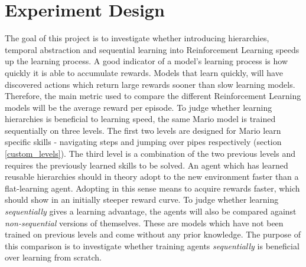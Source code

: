 \documentclass[notitlepage,a4paper,11pt]{article}
\begin{document}
\section{Experiment Design}
The goal of this project is to investigate whether introducing hierarchies, temporal abstraction and sequential learning into Reinforcement Learning speeds up the learning process. A good indicator of a model's learning process is how quickly it is able to accumulate rewards. Models that learn quickly, will have discovered actions which return large rewards sooner than slow learning models. Therefore, the main metric used to compare the different Reinforcement Learning models will be the average reward per episode. To judge whether learning hierarchies is beneficial to learning speed, the same Mario model is trained sequentially on three levels. The first two levels are designed for Mario learn specific skills - navigating steps and jumping over pipes respectively (section \ref{custom_levels}). The third level is a combination of the two previous levels and requires the previously learned skills to be solved. An agent which has learned reusable hierarchies should in theory adopt to the new environment faster than a flat-learning agent. Adopting in this sense means to acquire rewards faster, which should show in an initially steeper reward curve. To judge whether learning \textit{sequentially} gives a learning advantage, the agents will also be compared against \textit{non-sequential} versions of themselves. These are models which have not been trained on previous levels and come without any prior knowledge. The purpose of this comparison is to investigate whether training agents \textit{sequentially} is beneficial over learning from scratch.
\end{document}
